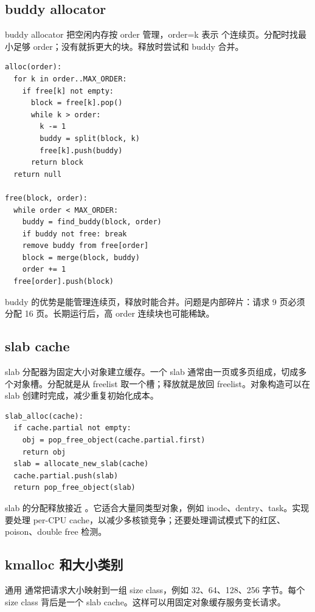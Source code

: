 \subsection{buddy allocator}

buddy allocator 把空闲内存按 order 管理，order=k 表示  个连续页。分配时找最小足够 order；没有就拆更大的块。释放时尝试和 buddy 合并。

\begin{lstlisting}
alloc(order):
  for k in order..MAX_ORDER:
    if free[k] not empty:
      block = free[k].pop()
      while k > order:
        k -= 1
        buddy = split(block, k)
        free[k].push(buddy)
      return block
  return null

free(block, order):
  while order < MAX_ORDER:
    buddy = find_buddy(block, order)
    if buddy not free: break
    remove buddy from free[order]
    block = merge(block, buddy)
    order += 1
  free[order].push(block)
\end{lstlisting}

buddy 的优势是能管理连续页，释放时能合并。问题是内部碎片：请求 9 页必须分配 16 页。长期运行后，高 order 连续块也可能稀缺。

\subsection{slab cache}

slab 分配器为固定大小对象建立缓存。一个 slab 通常由一页或多页组成，切成多个对象槽。分配就是从 freelist 取一个槽；释放就是放回 freelist。对象构造可以在 slab 创建时完成，减少重复初始化成本。

\begin{lstlisting}
slab_alloc(cache):
  if cache.partial not empty:
    obj = pop_free_object(cache.partial.first)
    return obj
  slab = allocate_new_slab(cache)
  cache.partial.push(slab)
  return pop_free_object(slab)
\end{lstlisting}

slab 的分配释放接近 。它适合大量同类型对象，例如 inode、dentry、task。实现要处理 per-CPU cache，以减少多核锁竞争；还要处理调试模式下的红区、poison、double free 检测。

\subsection{kmalloc 和大小类别}

通用  通常把请求大小映射到一组 size class，例如 32、64、128、256 字节。每个 size class 背后是一个 slab cache。这样可以用固定对象缓存服务变长请求。

